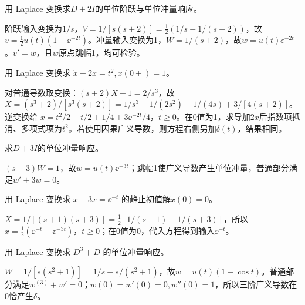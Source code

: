 \begin{exercise}\label{cw:rec18-4}
用 Laplace 变换求$D+2I$的单位阶跃与单位冲量响应。
\end{exercise}
\begin{solution}
阶跃输入变换为$1/s$，$V=1/[s(s+2)]=\frac12(1/s-1/(s+2))$，故$v=\frac12u(t)(1-\ee^{-2t})$。冲量输入变换为1，$W=1/(s+2)$，故$w=u(t)\ee^{-2t}$。$v'=w$，且$w$原点跳幅1，均可检验。
\par{}
\end{solution}

\begin{exercise}\label{cw:rec18-5}
用 Laplace 变换求 $\dot x+2x=t^2,x(0+)=1$。
\end{exercise}
\begin{solution}
对普通导数取变换：$(s+2)X-1=2/s^3$，故 $X=(s^3+2)/[s^3(s+2)]=1/s^3-1/(2s^2)+1/(4s)+3/[4(s+2)]$。逆变换给 $x=t^2/2-t/2+1/4+3\ee^{-2t}/4$，$t\ge0$。在0值为1，求导加$2x$后指数项抵消、多项式项为$t^2$。若使用因果广义导数，则方程右侧另加$\delta(t)$，结果相同。
\par{}
\end{solution}

\begin{exercise}\label{cw:rec19-1}
求$D+3I$的单位冲量响应。
\end{exercise}
\begin{solution}
$(s+3)W=1$，故$w=u(t)\ee^{-3t}$；跳幅1使广义导数产生单位冲量，普通部分满足$w'+3w=0$。
\par{}
\end{solution}

\begin{exercise}\label{cw:rec19-2}
用 Laplace 变换求 $\dot x+3x=\ee^{-t}$ 的静止初值解$x(0)=0$。
\end{exercise}
\begin{solution}
$X=1/[(s+1)(s+3)]=\frac12[1/(s+1)-1/(s+3)]$，所以 $x=\frac12(\ee^{-t}-\ee^{-3t})$，$t\ge0$；在0值为0，代入方程得到输入$\ee^{-t}$。
\par{}
\end{solution}

\begin{exercise}\label{cw:rec19-3}
用 Laplace 变换求 $D^3+D$ 的单位冲量响应。
\end{exercise}
\begin{solution}
$W=1/[s(s^2+1)]=1/s-s/(s^2+1)$，故$w=u(t)(1-\cos t)$。普通部分满足$w^{(3)}+w'=0$；$w(0)=w'(0)=0,w''(0)=1$，所以三阶广义导数在0恰产生$\delta$。
\par{}
\end{solution}

